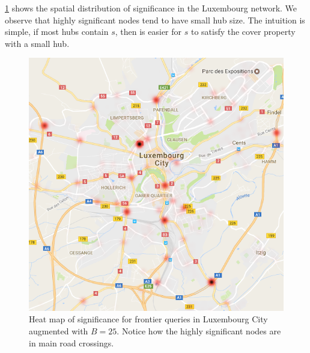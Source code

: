 \cref{fig:map_LU} shows the spatial distribution of significance in the Luxembourg network.
We observe that highly significant nodes tend to have small hub size.
The intuition is simple, if most hubs contain $s$, then is easier for $s$ to satisfy the cover property with a small hub.

\begin{figure}
\centering
\includegraphics[scale=0.3]{TexImg/map_LU_sig.png}
\caption{Heat map of significance for frontier queries in Luxembourg City augmented with $B=25$.
Notice how the highly significant nodes are in main road crossings.}
\label{fig:map_LU} 
\end{figure}